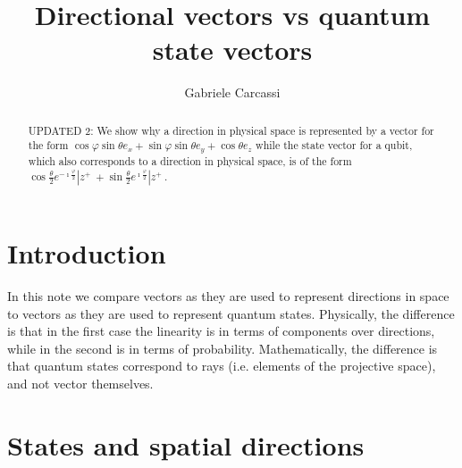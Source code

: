 \documentclass{techbrief}
\title{Directional vectors vs quantum state vectors}
\author{Gabriele Carcassi}
\begin{document}
\maketitle
	
\begin{abstract}
	UPDATED 2: We show why a direction in physical space is represented by a vector for the form $\cos \varphi \sin \theta e_x + \sin \varphi \sin \theta e_y + \cos \theta e_z$ while the state vector for a qubit, which also corresponds to a direction in physical space, is of the form $\cos \frac{\theta}{2} e^{-\imath \frac{\varphi}{2}} | z^+ \> + \sin \frac{\theta}{2} e^{\imath \frac{\varphi}{2}} | z^+ \>$.
\end{abstract}
	
\section{Introduction}

In this note we compare vectors as they are used to represent directions in space to vectors as they are used to represent quantum states. Physically, the difference is that in the first case the linearity is in terms of components over directions, while in the second is in terms of probability. Mathematically, the difference is that quantum states correspond to rays (i.e. elements of the projective space), and not vector themselves.

\section{States and spatial directions}
\end{document}
